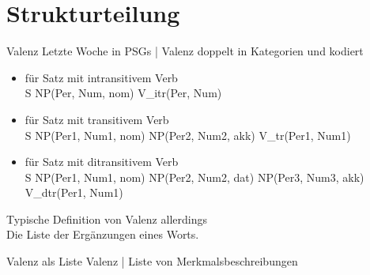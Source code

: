 \section{Strukturteilung}

\begin{frame}
  {Valenz}
  \onslide<+->
  \onslide<+->
  Letzte Woche in PSGs | Valenz doppelt in \alert{Kategorien} und  kodiert\\
  \Halbzeile
  \begin{itemize}[<+->]
    \item[ ]  für Satz mit intransitivem Verb\\
      \footnotesize S \goesto NP(Per, Num, nom) \alert{V\_itr}(Per, Num)
    \item[ ]  für Satz mit transitivem Verb\\
      \footnotesize S \goesto NP(Per1, Num1, nom) NP(Per2, Num2, akk) \alert{V\_tr}(Per1, Num1)
    \item[ ]  für Satz mit ditransitivem Verb\\
      \footnotesize S \goesto NP(Per1, Num1, nom) NP(Per2, Num2, dat) NP(Per3, Num3, akk) \alert{V\_dtr}(Per1, Num1)
  \end{itemize}
  \onslide<+->
  \Zeile
  \alert{Typische Definition von Valenz allerdings}\\
  \onslide<+->
  Die \alert{Liste} der Ergänzungen eines Worts.\\
\end{frame}

\begin{frame}
  {Valenz als Liste}
  \onslide<+->
  \onslide<+->
  Valenz | \alert{Liste von Merkmalsbeschreibungen}\\
  \onslide<+->
  \Halbzeile
\end{frame}

